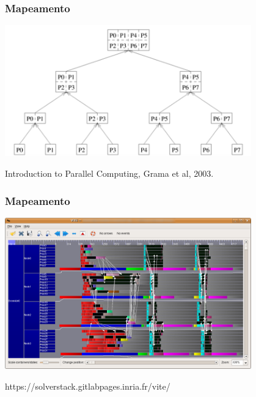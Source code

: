 \documentclass[xcolor={usenames,dvipsnames},12pt,presentation,aspectratio=169]{beamer}
\begin{document}
\begin{frame}
  \frametitle{Mapeamento}
  \vspace{-4mm}
  \begin{center}
	\includegraphics[width=0.8\textwidth]{map7.png}
  \end{center}
  \vfill
  {\tiny Introduction to Parallel Computing, Grama et al, 2003.}
\end{frame}
\begin{frame}
  \frametitle{Mapeamento}
  \vspace{-4mm}
  \begin{center}
	\includegraphics[width=0.8\textwidth]{vite.png}
  \end{center}
  \vfill
  {\tiny https://solverstack.gitlabpages.inria.fr/vite/}
\end{frame}
\end{document}
